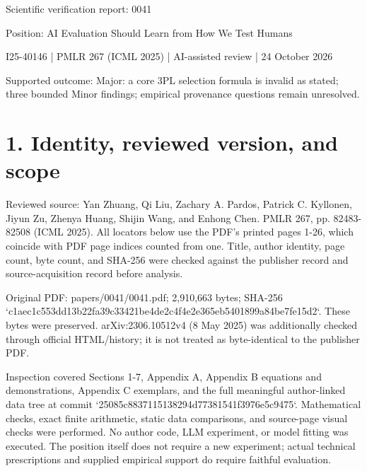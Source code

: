 \documentclass[10pt]{article}
\begin{document}
Scientific verification report: 0041\par
Position: AI Evaluation Should Learn from How We Test Humans\par
I25-40146 | PMLR 267 (ICML 2025) | AI-assisted review | 24 October 2026\par
Supported outcome: Major: a core 3PL selection formula is invalid as stated; three bounded Minor findings; empirical provenance questions remain unresolved.\par
\section*{1. Identity, reviewed version, and scope}
Reviewed source: Yan Zhuang, Qi Liu, Zachary A. Pardos, Patrick C. Kyllonen, Jiyun Zu, Zhenya Huang, Shijin Wang, and Enhong Chen. PMLR 267, pp. 82483-82508 (ICML 2025). All locators below use the PDF’s printed pages 1-26, which coincide with PDF page indices counted from one. Title, author identity, page count, byte count, and SHA-256 were checked against the publisher record and source-acquisition record before analysis.\par
Original PDF: papers/0041/0041.pdf; 2,910,663 bytes; SHA-256 `c1aec1c553dd13b22fa39c33421be4de2c4f4e2e365eb5401899a84be7fe15d2`. These bytes were preserved. arXiv:2306.10512v4 (8 May 2025) was additionally checked through official HTML/history; it is not treated as byte-identical to the publisher PDF.\par
Inspection covered Sections 1-7, Appendix A, Appendix B equations and demonstrations, Appendix C exemplars, and the full meaningful author-linked data tree at commit `25085c8837115138294d77381541f3976e5c9475`. Mathematical checks, exact finite arithmetic, static data comparisons, and source-page visual checks were performed. No author code, LLM experiment, or model fitting was executed. The position itself does not require a new experiment; actual technical prescriptions and supplied empirical support do require faithful evaluation.\par
\end{document}

